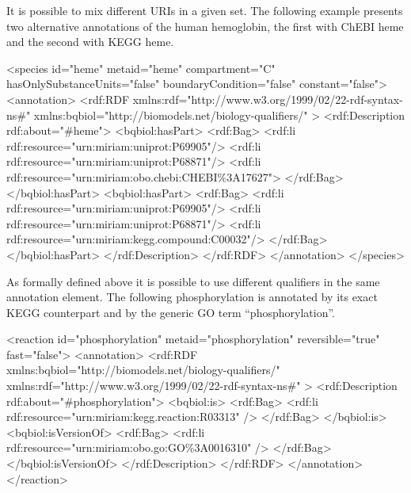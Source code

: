 It is possible to mix different URIs in a given set. The
following example presents two alternative annotations of the human
hemoglobin, the first with ChEBI heme and the second with KEGG
heme.

\begin{example}
<species id="heme" metaid="heme" compartment="C"
         hasOnlySubstanceUnits="false" boundaryCondition="false"
         constant="false">
  <annotation>
    <rdf:RDF
      xmlns:rdf="http://www.w3.org/1999/02/22-rdf-syntax-ns\#"
      xmlns:bqbiol="http://biomodels.net/biology-qualifiers/"
    >
     <rdf:Description rdf:about="\#heme">
       <bqbiol:hasPart>
         <rdf:Bag>
           <rdf:li rdf:resource="urn:miriam:uniprot:P69905"/>
           <rdf:li rdf:resource="urn:miriam:uniprot:P68871"/>
           <rdf:li rdf:resource="urn:miriam:obo.chebi:CHEBI\%3A17627">
         </rdf:Bag>
       </bqbiol:hasPart>
       <bqbiol:hasPart>
         <rdf:Bag>
          <rdf:li rdf:resource="urn:miriam:uniprot:P69905"/>
           <rdf:li rdf:resource="urn:miriam:uniprot:P68871"/>
           <rdf:li rdf:resource="urn:miriam:kegg.compound:C00032"/>
         </rdf:Bag>
       </bqbiol:hasPart>
     </rdf:Description>
   </rdf:RDF>
  </annotation>
</species>
\end{example}

As formally defined above it is possible to use different
qualifiers in the same annotation element. The following
phosphorylation is annotated by its exact KEGG counterpart and by
the generic GO term ``phosphorylation''.

\begin{example}
<reaction id="phosphorylation" metaid="phosphorylation"
          reversible="true" fast="false">
  <annotation>
    <rdf:RDF
      xmlns:bqbiol="http://biomodels.net/biology-qualifiers/"
      xmlns:rdf="http://www.w3.org/1999/02/22-rdf-syntax-ns\#"
    >
      <rdf:Description rdf:about="\#phosphorylation">
        <bqbiol:is>
          <rdf:Bag>
            <rdf:li rdf:resource="urn:miriam:kegg.reaction:R03313" />
          </rdf:Bag>
        </bqbiol:is>
        <bqbiol:isVersionOf>
          <rdf:Bag>
            <rdf:li rdf:resource="urn:miriam:obo.go:GO\%3A0016310" />
          </rdf:Bag>
        </bqbiol:isVersionOf>
      </rdf:Description>
    </rdf:RDF>
  </annotation>
</reaction>
\end{example}
